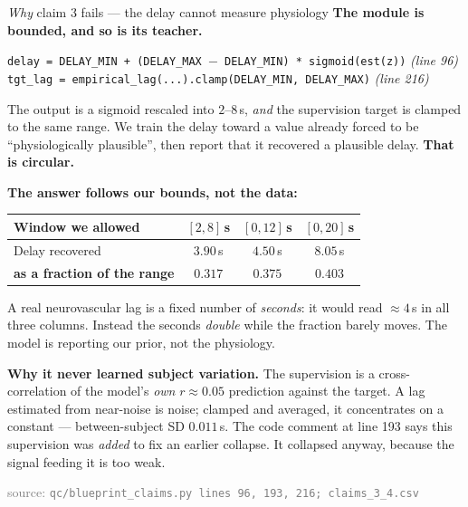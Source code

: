 \documentclass[aspectratio=169,11pt]{beamer}
\newcommand{\src}[1]{{\scriptsize\textcolor{gray}{source: \texttt{#1}}}}
\begin{document}
\begin{frame}{\emph{Why} claim 3 fails --- the delay cannot measure physiology}
\textbf{The module is bounded, and so is its teacher.}
\begin{center}\footnotesize
\texttt{delay = DELAY\_MIN + (DELAY\_MAX $-$ DELAY\_MIN) * sigmoid(est(z))}
\hfill\emph{(line 96)} \\
\texttt{tgt\_lag = empirical\_lag(...).clamp(DELAY\_MIN, DELAY\_MAX)}
\hfill\emph{(line 216)}
\end{center}
The output is a sigmoid rescaled into $2$--$8$\,s, \emph{and} the supervision
target is clamped to the same range. We train the delay toward a value already
forced to be ``physiologically plausible'', then report that it recovered a
plausible delay. \textcolor{bad}{\textbf{That is circular.}}

\vspace{0.5em}
\textbf{The answer follows our bounds, not the data:}
\begin{center}\small
\begin{tabular}{lccc}
\toprule
Window we allowed & $[2,8]$\,s & $[0,12]$\,s & $[0,20]$\,s \\
\midrule
Delay recovered & $3.90$\,s & $4.50$\,s & $8.05$\,s \\
\textbf{as a fraction of the range} & $\mathbf{0.317}$ & $\mathbf{0.375}$ & $\mathbf{0.403}$ \\
\bottomrule
\end{tabular}
\end{center}
A real neurovascular lag is a fixed number of \emph{seconds}: it would read
$\approx4$\,s in all three columns. Instead the seconds \emph{double} while the
fraction barely moves. The model is reporting our prior, not the physiology.

\vspace{0.5em}
\textbf{Why it never learned subject variation.} The supervision is a
cross-correlation of the model's \emph{own} $r\approx0.05$ prediction against the
target. A lag estimated from near-noise is noise; clamped and averaged, it
concentrates on a constant --- between-subject SD $\mathbf{0.011}$\,s. The code
comment at line 193 says this supervision was \emph{added} to fix an earlier
collapse. It collapsed anyway, because the signal feeding it is too weak.

\vspace{0.2em}
\src{qc/blueprint\_claims.py lines 96, 193, 216; claims\_3\_4.csv}
\end{frame}
\end{document}
